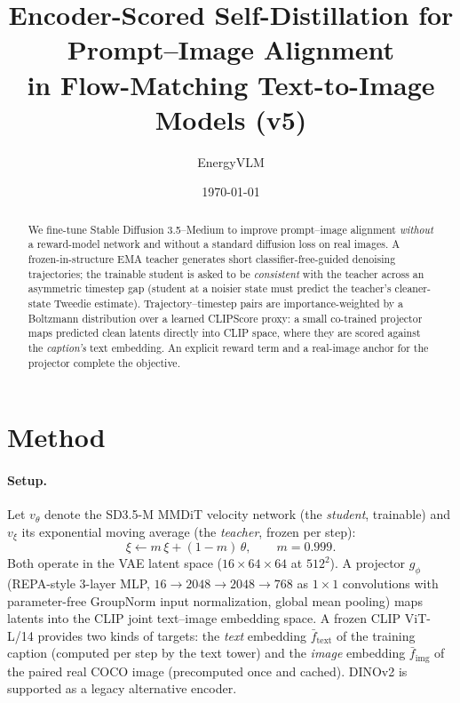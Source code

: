\documentclass[10pt]{article}
\title{\textbf{Encoder-Scored Self-Distillation for Prompt--Image Alignment\\in Flow-Matching Text-to-Image Models (v5)}}
\author{EnergyVLM}
\date{\today}
\newcommand{\ftext}{\bar{f}_{\mathrm{text}}}
\newcommand{\fimg}{\bar{f}_{\mathrm{img}}}
\begin{document}
\maketitle

\begin{abstract}
We fine-tune Stable Diffusion 3.5--Medium to improve prompt--image alignment
\emph{without} a reward-model network and without a standard diffusion loss on
real images. A frozen-in-structure EMA teacher generates short
classifier-free-guided denoising trajectories; the trainable student is asked
to be \emph{consistent} with the teacher across an asymmetric timestep gap
(student at a noisier state must predict the teacher's cleaner-state Tweedie
estimate). Trajectory--timestep pairs are importance-weighted by a Boltzmann
distribution over a learned CLIPScore proxy: a small co-trained projector maps
predicted clean latents directly into CLIP space, where they are scored
against the \emph{caption's} text embedding. An explicit reward term and a
real-image anchor for the projector complete the objective.
\end{abstract}

\section{Method}

\paragraph{Setup.}
Let $v_\theta$ denote the SD3.5-M MMDiT velocity network (the
\emph{student}, trainable) and $v_\xi$ its exponential moving average (the
\emph{teacher}, frozen per step):
\begin{equation}
\xi \leftarrow m\,\xi + (1-m)\,\theta, \qquad m = 0.999 .
\label{eq:ema}
\end{equation}
Both operate in the VAE latent space ($16 \times 64 \times 64$ at $512^2$).
A projector $g_\phi$ (REPA-style 3-layer MLP, $16 \to 2048 \to 2048 \to 768$
as $1{\times}1$ convolutions with parameter-free GroupNorm input
normalization, global mean pooling) maps latents into the CLIP joint
text--image embedding space. A frozen CLIP ViT-L/14 provides two kinds of
targets: the \emph{text} embedding $\ftext$ of the training caption (computed
per step by the text tower) and the \emph{image} embedding $\fimg$ of the
paired real COCO image (precomputed once and cached). DINOv2 is supported as
a legacy alternative encoder.
\end{document}

